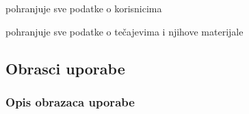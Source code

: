 \begin{packed_enum}
\begin{packed_enum}
				\end{packed_enum}
			
			
				\item  {}
				
				\begin{packed_enum}
					
					\item pohranjuje sve podatke o korisnicima
					\item pohranjuje sve podatke o tečajevima i njihove materijale
					
				\end{packed_enum}
			\end{packed_enum}
			
			\eject 
			
			
				
			\subsection{Obrasci uporabe}
				
				
				\subsubsection{Opis obrazaca uporabe}

